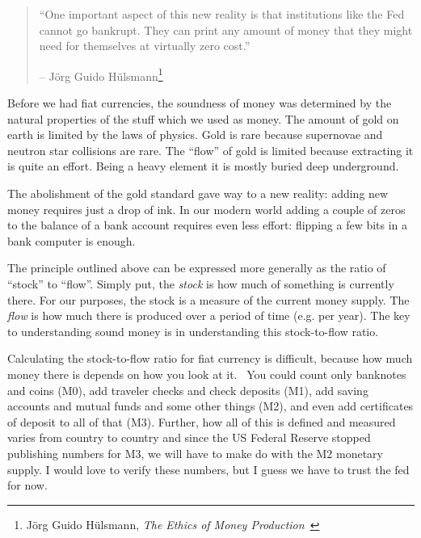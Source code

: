 \begin{samepage}\begin{quotation}
\enquote{One important aspect of this new reality is that institutions like
the Fed cannot go bankrupt. They can print any amount of money that
they might need for themselves at virtually zero cost.}
\begin{flushright} -- Jörg Guido Hülsmann\footnote{Jörg Guido Hülsmann, \textit{The
Ethics of Money Production}~\cite{hulsmann2008ethics}}
\end{flushright}\end{quotation}\end{samepage}

Before we had fiat currencies, the soundness of money was determined by
the natural properties of the stuff which we used as money. The amount
of gold on earth is limited by the laws of physics. Gold is rare because
supernovae and neutron star collisions are rare. The \enquote{flow} of gold is
limited because extracting it is quite an effort. Being a heavy element
it is mostly buried deep underground.

The abolishment of the gold standard gave way to a new reality: adding new money
requires just a drop of ink. In our modern world adding a couple of zeros to the
balance of a bank account requires even less effort: flipping a few bits in a
bank computer is enough.


The principle outlined above can be expressed more generally as the
ratio of \enquote{stock} to \enquote{flow}. Simply put, the \textit{stock} is how much of
something is currently there. For our purposes, the stock is a measure
of the current money supply. The \textit{flow} is how much there is produced
over a period of time (e.g. per year). The key to understanding sound
money is in understanding this stock-to-flow ratio.

Calculating the stock-to-flow ratio for fiat currency is difficult, because how
much money there is depends on how you look at it.~\cite{wiki:money-supply} You
could count only banknotes and coins (M0), add traveler checks and check
deposits (M1), add saving accounts and mutual funds and some other things (M2),
and even add certificates of deposit to all of that (M3). Further, how all of
this is defined and measured varies from country to country and since the US
Federal Reserve stopped publishing \cite{web:fed-m3} numbers for M3, we will
have to make do with the M2 monetary supply. I would love to verify these
numbers, but I guess we have to trust the fed for now.

